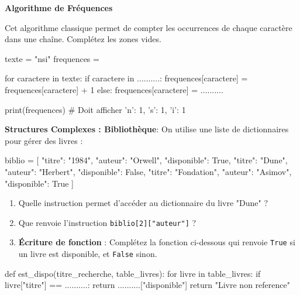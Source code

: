 \documentclass[11pt, a4paper]{report}
\begin{document}
    \begin{exercice_cours}[\quad]{}

        \textbf{Algorithme de Fréquences} 

Cet algorithme classique permet de compter les occurrences de chaque caractère dans une chaîne. Complétez les zones vides.

    \begin{CodePythontexAlt}[TaillePolice=\normalsize, Largeur=1\linewidth,Centre,Lignes=false]{}
texte = "nsi"
frequences = {}

for caractere in texte:
    if caractere in ..........:
        frequences[caractere] = frequences[caractere] + 1
    else:
        frequences[caractere] = ..........

print(frequences) # Doit afficher {'n': 1, 's': 1, 'i': 1}
\end{CodePythontexAlt}
    \end{exercice_cours}


    \begin{exercice_cours}[\quad]{}
\textbf{Structures Complexes : Bibliothèque}: On utilise une liste de dictionnaires pour gérer des livres :
    \begin{CodePythontexAlt}[TaillePolice=\normalsize, Largeur=1\linewidth,Centre,Lignes=false]{}
biblio = [
    {"titre": "1984", "auteur": "Orwell", "disponible": True},
    {"titre": "Dune", "auteur": "Herbert", "disponible": False},
    {"titre": "Fondation", "auteur": "Asimov", "disponible": True}
]
\end{CodePythontexAlt}

\begin{enumerate}
    \item Quelle instruction permet d'accéder au dictionnaire du livre "Dune" ?
    \item Que renvoie l'instruction \texttt{biblio[2]["auteur"]} ?
    \item \textbf{Écriture de fonction} : Complétez la fonction ci-dessous qui renvoie \texttt{True} si un livre est disponible, et \texttt{False} sinon.
\end{enumerate}

    \begin{CodePythontexAlt}[TaillePolice=\normalsize, Largeur=1\linewidth,Centre,Lignes=false]{}
def est_dispo(titre_recherche, table_livres):
    for livre in table_livres:
        if livre["titre"] == ..........:
            return ..........["disponible"]
    return "Livre non reference"
\end{CodePythontexAlt}
    \end{exercice_cours}
\end{document}
